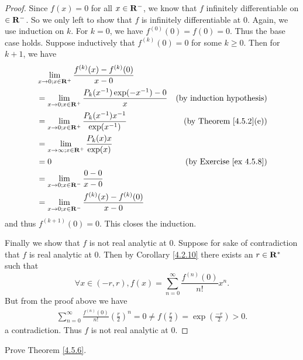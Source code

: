 \begin{proof}
    Since \(f(x) = 0\) for all \(x \in \mathbf{R}^-\), we know that \(f\) infinitely differentiable on \(\in \mathbf{R}^-\).
    So we only left to show that \(f\) is infinitely differentiable at \(0\).
    Again, we use induction on \(k\).
    For \(k = 0\), we have \(f^{(0)}(0) = f(0) = 0\).
    Thus the base case holds.
    Suppose inductively that \(f^{(k)}(0) = 0\) for some \(k \geq 0\).
    Then for \(k + 1\), we have
    \begin{align*}
         & \lim_{x \to 0 ; x \in \mathbf{R}^+} \frac{f^{(k)}(x) - f^{(k)}(0)}{x - 0}                                           \\
         & = \lim_{x \to 0 ; x \in \mathbf{R}^+} \frac{P_k(x^{-1}) \exp(-x^{-1}) - 0}{x} & \text{(by induction hypothesis)}    \\
         & = \lim_{x \to 0 ; x \in \mathbf{R}^+} \frac{P_k(x^{-1}) x^{-1}}{\exp(x^{-1})} & \text{(by Theorem \ref{4.5.2}(e))}  \\
         & = \lim_{x \to \infty ; x \in \mathbf{R}^+} \frac{P_k(x) x}{\exp(x)}                                                 \\
         & = 0                                                                   & \text{(by Exercise \ref{ex 4.5.8})} \\
         & = \lim_{x \to 0 ; x \in \mathbf{R}^-} \frac{0 - 0}{x - 0}                                                           \\
         & = \lim_{x \to 0 ; x \in \mathbf{R}^-} \frac{f^{(k)}(x) - f^{(k)}(0)}{x - 0}
    \end{align*}
    and thus \(f^{(k + 1)}(0) = 0\).
    This closes the induction.

    Finally we show that \(f\) is not real analytic at \(0\).
    Suppose for sake of contradiction that \(f\) is real analytic at \(0\).
    Then by Corollary \ref{4.2.10} there exists an \(r \in \mathbf{R}^*\) such that
    \[
        \forall x \in (-r, r), f(x) = \sum_{n = 0}^\infty \frac{f^{(n)}(0)}{n!} x^n.
    \]
    But from the proof above we have
    \begin{align*}
        \sum_{n = 0}^\infty \frac{f^{(n)}(0)}{n!} (\frac{r}{2})^n = 0 \neq f(\frac{r}{2}) = \exp(\frac{-r}{2}) > 0.
    \end{align*}
    a contradiction.
    Thus \(f\) is not real analytic at \(0\).
\end{proof}

\begin{exercise}\label{ex 4.5.5}
    Prove Theorem \ref{4.5.6}.
\end{exercise}


